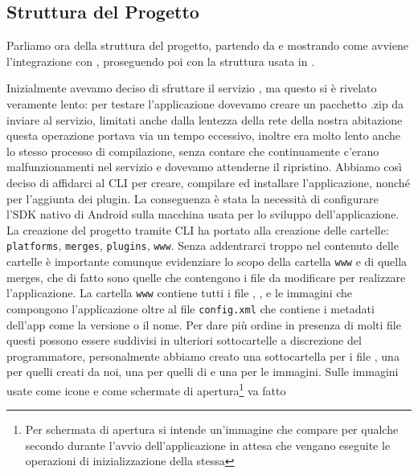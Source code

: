         \subsection{Struttura del Progetto}
            Parliamo ora della struttura del progetto, partendo da \pg{} e mostrando
            come avviene l'integrazione con \kendomob{}, proseguendo poi con
            la struttura usata in \tisdk{}.

            Inizialmente avevamo deciso di sfruttare il servizio \pgb{},
            ma questo si è rivelato veramente lento: per testare l'applicazione
            dovevamo creare un pacchetto .zip da inviare al servizio, limitati
            anche dalla lentezza della rete della nostra abitazione questa operazione
            portava via un tempo eccessivo, inoltre era molto lento anche
            lo stesso processo di compilazione, senza contare che continuamente
            c'erano malfunzionamenti nel servizio e dovevamo attenderne il ripristino.
            Abbiamo così deciso di affidarci al CLI per creare, compilare ed
            installare l'applicazione, nonché per l'aggiunta dei plugin. La
            conseguenza è stata la necessità di configurare l'SDK nativo di Android
            sulla macchina usata per lo sviluppo dell'applicazione.
            La creazione del progetto tramite CLI ha portato alla creazione
            delle cartelle: \texttt{platforms}, \texttt{merges}, \texttt{plugins}, \texttt{www}.
            Senza addentrarci troppo nel contenuto delle cartelle è importante
            comunque evidenziare lo scopo della cartella \texttt{www} e di quella merges,
            che di fatto sono quelle che contengono i file da modificare per
            realizzare l'applicazione.
            La cartella \texttt{www} contiene tutti i file \html{}, \css{}, \js{} e le immagini
            che compongono l'applicazione oltre al file \texttt{config.xml} che contiene
            i metadati dell'app come la versione o il nome.
            Per dare più ordine in presenza di molti
            file questi possono essere suddivisi in ulteriori sottocartelle a
            discrezione del programmatore, personalmente abbiamo creato una sottocartella
            per i file \css{},
            una per quelli \js{} creati da noi, una per quelli \js{} di \kendomob{} e
            una per le immagini.
            Sulle immagini usate come icone e come schermate di apertura\footnote{
            Per schermata di apertura si intende un'immagine che compare per qualche
            secondo durante l'avvio dell'applicazione in attesa che vengano eseguite
            le operazioni di inizializzazione della stessa} va fatto

